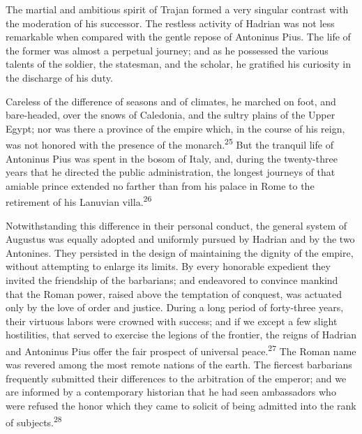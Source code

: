 
The martial and ambitious spirit of Trajan formed a very singular
contrast with the moderation of his successor. The restless
activity of Hadrian was not less remarkable when compared with
the gentle repose of Antoninus Pius. The life of the former was
almost a perpetual journey; and as he possessed the various
talents of the soldier, the statesman, and the scholar, he
gratified his curiosity in the discharge of his duty.

Careless of the difference of seasons and of climates, he marched
on foot, and bare-headed, over the snows of Caledonia, and the
sultry plains of the Upper Egypt; nor was there a province of the
empire which, in the course of his reign, was not honored with
the presence of the monarch.\textsuperscript{25} But the tranquil life of
Antoninus Pius was spent in the bosom of Italy, and, during the
twenty-three years that he directed the public administration,
the longest journeys of that amiable prince extended no farther
than from his palace in Rome to the retirement of his Lanuvian
villa.\textsuperscript{26}



Notwithstanding this difference in their personal conduct, the
general system of Augustus was equally adopted and uniformly
pursued by Hadrian and by the two Antonines. They persisted in
the design of maintaining the dignity of the empire, without
attempting to enlarge its limits. By every honorable expedient
they invited the friendship of the barbarians; and endeavored to
convince mankind that the Roman power, raised above the
temptation of conquest, was actuated only by the love of order
and justice. During a long period of forty-three years, their
virtuous labors were crowned with success; and if we except a few
slight hostilities, that served to exercise the legions of the
frontier, the reigns of Hadrian and Antoninus Pius offer the fair
prospect of universal peace.\textsuperscript{27} The Roman name was revered among
the most remote nations of the earth. The fiercest barbarians
frequently submitted their differences to the arbitration of the
emperor; and we are informed by a contemporary historian that he
had seen ambassadors who were refused the honor which they came
to solicit of being admitted into the rank of subjects.\textsuperscript{28}

